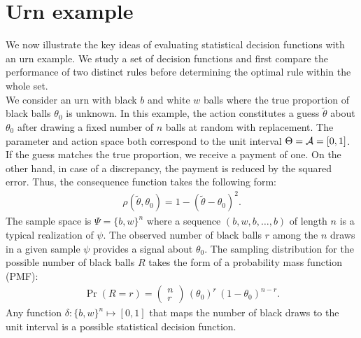 \section*{Urn example}
We now illustrate the key ideas of evaluating statistical decision functions with an urn example. We study a set of decision functions and first compare the performance of two distinct rules before determining the optimal rule within the whole set.\\

We consider an urn with black $b$ and white $w$ balls where the true proportion of black balls $\theta_0$ is unknown. In this example, the action constitutes a guess $\tilde{\theta}$ about $\theta_0$ after drawing a fixed number of $n$ balls at random with replacement. The parameter and action space both correspond to the unit interval $\Theta = \mathcal{A} = [0, 1]$. \\

If the guess matches the true proportion, we receive a payment of one. On the other hand, in case of a discrepancy, the payment is reduced by the squared error. Thus, the consequence function takes the following form:
%
\begin{align*}
\rho(\tilde{\theta}, \theta_0) = 1 - (\tilde{\theta} - \theta_0)^2.
\end{align*}
%
The sample space is $\Psi = \{b, w\}^n$ where a sequence $(b, w, b, \hdots, b)$ of length $n$ is a typical realization of $\psi$. The observed number of black balls $r$ among the $n$ draws in a given sample $\psi$ provides a signal about $\theta_0$. The sampling distribution for the possible number of black balls $R$ takes the form of a probability mass function (PMF):
%
\begin{align*}
\Pr(R = r) = \left(\begin{array}{c} n \\ r \end{array} \right)\, (\theta_0)^r\, (1 - \theta_0)^{n-r}.
\end{align*}
%
Any function $\delta:  \{b, w\}^n \mapsto [0, 1]$ that maps the number of black draws to the unit interval is a possible statistical decision function.\\

